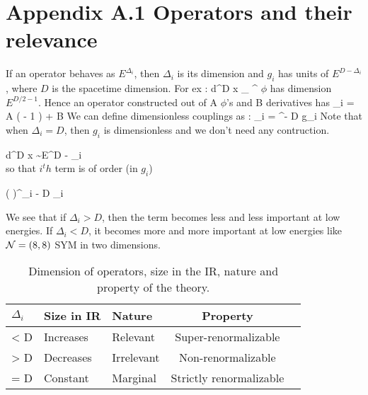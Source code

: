 

 \section*{\label{app:sugra_details} \noindent Appendix A.1 Operators and their relevance}


If an operator \cO behaves as $E^{\Delta_{i}}$, then $\Delta_{i}$ is its dimension and $g_{i}$ has units of $E^{D - \Delta_{i}}$, where $D$ is the spacetime dimension. For ex : 
\beq
{} \int d^D x \partial_{\mu} \phi \partial ^{\mu} \phi 
\eeq
$\phi$ has dimension $E^{D/2 - 1}$. Hence an operator constructed out of A $\phi$'s and B derivatives has 
\beq
\Delta_{i} = A \Bigg ( - 1 \Bigg) + B 
\eeq
We can define dimensionless couplings as : 
\beq
\lambda_{i} = \Lambda^{\Delta - D} g_{i} 
\eeq
Note that when $ \Delta_{i} = D$, then $g_{i}$ is dimensionless and we don't need any contruction. 


\bea
\int d^{D} x \cO \sim E^{D - \Delta_{i}} \\ 
\eea 
so that $i^th$ term is of order (in $g_{i}$) 

\beq
\Bigg ( \Bigg)^{\Delta_{i} - D} \lambda_{i} 
\eeq

We see that if $\Delta_{i} > D$, then the term becomes less and less important at low energies. If $\Delta_{i} < D$, it becomes more and more important at low energies like $\mathcal N = (8,8)$ SYM in two dimensions. 

\begin {table}
 \renewcommand\arraystretch{1.9}   %
  \addtolength{\tabcolsep}{2 pt}    %
\begin{center}
\begin{tabular}{ |  p{2cm} |  p{2cm} || p{2cm} |c || p{4cm}}
    \hline
    $\Delta_{i}$ & Size in IR & Nature & Property  \\ \hline  \hline
     < D  & Increases  &  Relevant & Super-renormalizable \\ \hline 
     > D  & Decreases &  Irrelevant & Non-renormalizable \\ \hline 
     = D  & Constant & Marginal & Strictly renormalizable \\ \hline
\end{tabular}
\vspace{3mm}
\caption {Dimension of operators, size in the IR, nature and property of the theory.} 
\end{center}
\end {table}




